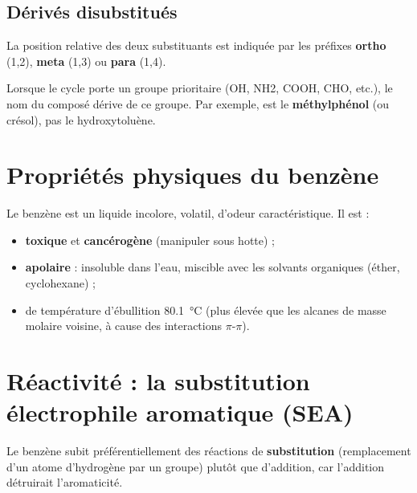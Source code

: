 \subsection{Dérivés disubstitués}

La position relative des deux substituants est indiquée par les préfixes \textbf{ortho} (1,2), \textbf{meta} (1,3) ou \textbf{para} (1,4).

\begin{illus}
\qquad
{}
\qquad
{}
\end{illus}

\begin{remarque}
Lorsque le cycle porte un groupe prioritaire (OH, NH2, COOH, CHO, etc.), le nom du composé dérive de ce groupe. Par exemple,  est le \textbf{méthylphénol} (ou crésol), pas le hydroxytoluène.
\end{remarque}

\section{Propriétés physiques du benzène}

\begin{propriete}
Le benzène est un liquide incolore, volatil, d'odeur caractéristique. Il est :
\begin{itemize}
    \item \textbf{toxique} et \textbf{cancérogène} (manipuler sous hotte) ;
    \item \textbf{apolaire} : insoluble dans l'eau, miscible avec les solvants organiques (éther, cyclohexane) ;
    \item de température d'ébullition \SI{80.1}{\celsius} (plus élevée que les alcanes de masse molaire voisine, à cause des interactions $\pi$-$\pi$).
\end{itemize}
\end{propriete}

\section{Réactivité : la substitution électrophile aromatique (SEA)}

Le benzène subit préférentiellement des réactions de \textbf{substitution} (remplacement d'un atome d'hydrogène par un groupe) plutôt que d'addition, car l'addition détruirait l'aromaticité.

